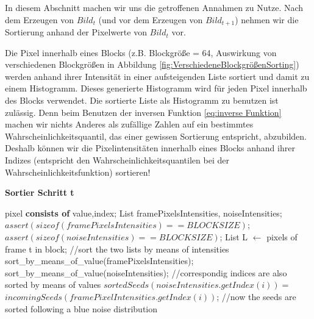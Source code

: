 In diesem Abschnitt machen wir uns die getroffenen  Annahmen 
zu Nutze. Nach dem Erzeugen von $Bild_{t}$ (und vor dem Erzeugen von $Bild_{t+1}$) nehmen wir die Sortierung
anhand der Pixelwerte von $Bild_{t}$ vor. 

\par

Die Pixel innerhalb eines Blocks (z.B. Blockgröße = 64, Auswirkung von verschiedenen Blockgrößen in Abbildung \ref{fig:VerschiedeneBlockgrößenSorting}) werden anhand ihrer 
Intensität in einer aufsteigenden Liste sortiert und damit zu einem Histogramm. Dieses generierte Histogramm wird für jeden Pixel innerhalb des Blocks verwendet.
Die sortierte Liste als Histogramm zu benutzen ist zulässig. Denn beim Benutzen der inversen Funktion \ref{eq:inverse Funktion} machen wir nichts Anderes als 
zufällige Zahlen auf ein bestimmtes Wahrscheinlichkeitsquantil, das einer gewissen Sortierung entspricht, abzubilden. Deshalb können wir die Pixelintensitäten 
innerhalb eines Blocks anhand ihrer Indizes (entspricht den Wahrscheinlichkeitsquantilen bei der Wahrscheinlichkeitsfunktion) sortieren! 

\begin{tcolorbox}
\begin{algorithm}[H]
    \caption{\textbf{Sortier Schritt t}}
    \begin{algorithmic}[1]
        \State pixel \textbf{consists of} value,index;
        \State List framePixelsIntensities, noiseIntensities;
        \State $assert(sizeof(framePixelsIntensities)==BLOCKSIZE)$;
        \State $assert(sizeof(noiseIntensities)==BLOCKSIZE)$;
        \State List L $\leftarrow$ pixels of frame t in block;
        \State \hfill
        \State //sort the two lists by means of intensities
        \State sort\_by\_means\_of\_value(framePixelsIntensities);
        \State sort\_by\_means\_of\_value(noiseIntensities);
        \State \hfill
        \State //correspondig indices are also sorted by means of values
        \State $sortedSeeds(noiseIntensities.getIndex(i)) = $
        \State $incomingSeeds(framePixelIntensities.getIndex(i))$;
        \EndFor
        \State //now the seeds are sorted following a blue noise distribution
    \end{algorithmic}
    \label{alg:Sortier}
\end{algorithm}
\end{tcolorbox}


